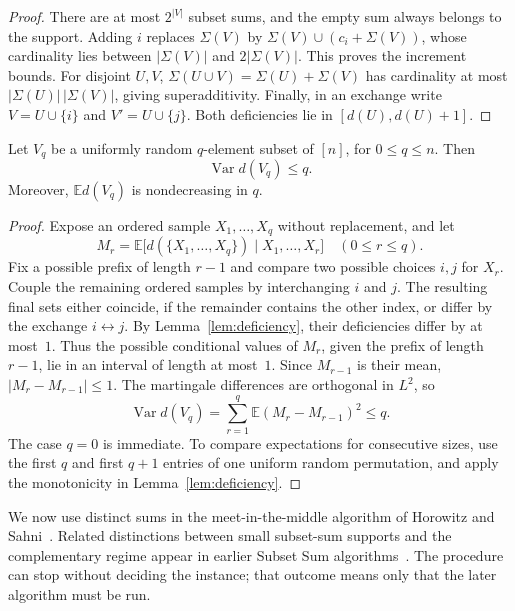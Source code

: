 \begin{proof}
There are at most $2^{|V|}$ subset sums, and the empty sum always
belongs to the support.  Adding $i$ replaces $\Sigma(V)$ by
$\Sigma(V)\cup(c_i+\Sigma(V))$, whose cardinality lies between
$|\Sigma(V)|$ and $2|\Sigma(V)|$.  This proves the increment bounds.
For disjoint $U,V$,
$\Sigma(U\cup V)=\Sigma(U)+\Sigma(V)$ has cardinality at most
$|\Sigma(U)|\,|\Sigma(V)|$, giving superadditivity.  Finally, in an
exchange write $V=U\cup\{i\}$ and $V'=U\cup\{j\}$.  Both
deficiencies lie in $[d(U),d(U)+1]$.
\end{proof}

\begin{lemma}
\label{lem:half-variance}
Let $V_q$ be a uniformly random $q$-element subset of $[n]$, for
$0\le q\le n$.  Then
\[
 \operatorname{Var}d(V_q)\le q.
\]
Moreover, $\mathbb E d(V_q)$ is nondecreasing in $q$.
\end{lemma}

\begin{proof}
Expose an ordered sample $X_1,\ldots,X_q$ without replacement, and let
\[
 M_r=\mathbb E\bigl[d(\{X_1,\ldots,X_q\})
                   \mid X_1,\ldots,X_r\bigr]
 \quad(0\le r\le q).
\]
Fix a possible prefix of length $r-1$ and compare two possible choices
$i,j$ for $X_r$.  Couple the remaining ordered samples by interchanging
$i$ and $j$.  The resulting final sets either coincide, if the remainder
contains the other index, or differ by the exchange $i\leftrightarrow j$.
By Lemma~\ref{lem:deficiency}, their deficiencies differ by at most~$1$.
Thus the possible conditional values of $M_r$, given the prefix of
length $r-1$, lie in an interval of length at most~$1$.  Since $M_{r-1}$
is their mean, $|M_r-M_{r-1}|\le1$.  The martingale differences are
orthogonal in $L^2$, so
\[
 \operatorname{Var}d(V_q)
 =\sum_{r=1}^q\mathbb E(M_r-M_{r-1})^2\le q.
\]
The case $q=0$ is immediate.  To compare expectations for consecutive
sizes, use the first $q$ and first $q+1$ entries of one uniform random
permutation, and apply the monotonicity in Lemma~\ref{lem:deficiency}.
\end{proof}

We now use distinct sums in the meet-in-the-middle algorithm of
Horowitz and Sahni~\cite{HorowitzSahni1974}.  Related distinctions between
small subset-sum supports and the complementary regime appear in earlier
Subset Sum algorithms~\cite{AKKN2016,NederlofWegrzycki2021}.
The procedure can stop without deciding the instance; that outcome
means only that the later algorithm must be run.

